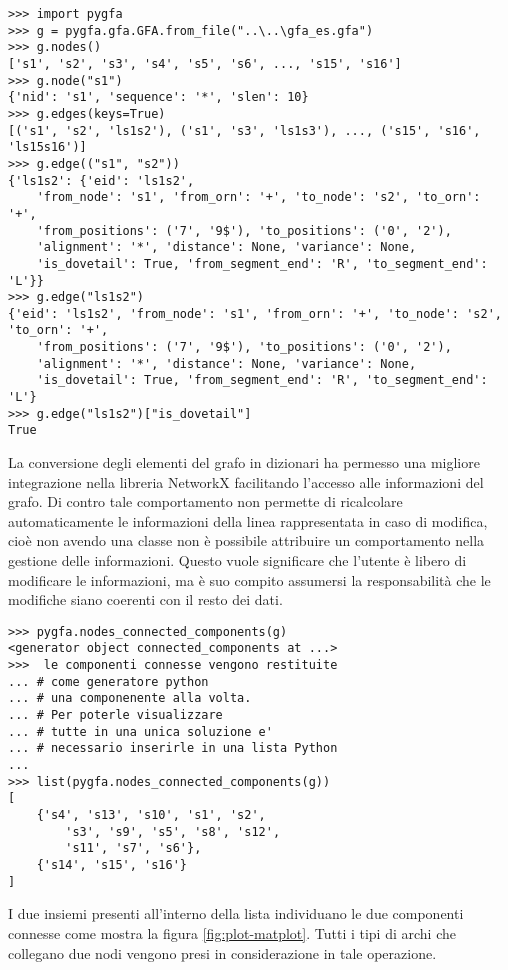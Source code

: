 \captionsetup{justification=centering, singlelinecheck=false}
\begin{minipage}{\linewidth}
\begin{lstlisting}[basicstyle=\ttfamily\scriptsize, frame=topline]
>>> import pygfa
>>> g = pygfa.gfa.GFA.from_file("..\..\gfa_es.gfa")
>>> g.nodes()
['s1', 's2', 's3', 's4', 's5', 's6', ..., 's15', 's16']
>>> g.node("s1")
{'nid': 's1', 'sequence': '*', 'slen': 10}
>>> g.edges(keys=True)
[('s1', 's2', 'ls1s2'), ('s1', 's3', 'ls1s3'), ..., ('s15', 's16', 'ls15s16')]
>>> g.edge(("s1", "s2"))
{'ls1s2': {'eid': 'ls1s2',
	'from_node': 's1', 'from_orn': '+', 'to_node': 's2', 'to_orn': '+',
	'from_positions': ('7', '9$'), 'to_positions': ('0', '2'),
	'alignment': '*', 'distance': None, 'variance': None,
	'is_dovetail': True, 'from_segment_end': 'R', 'to_segment_end': 'L'}}
>>> g.edge("ls1s2")
{'eid': 'ls1s2', 'from_node': 's1', 'from_orn': '+', 'to_node': 's2', 'to_orn': '+',
	'from_positions': ('7', '9$'), 'to_positions': ('0', '2'),
	'alignment': '*', 'distance': None, 'variance': None,
	'is_dovetail': True, 'from_segment_end': 'R', 'to_segment_end': 'L'}
>>> g.edge("ls1s2")["is_dovetail"]
True
\end{lstlisting}
\end{minipage}
\captionsetup{justification=justified, singlelinecheck=false}
La conversione degli elementi del grafo in dizionari ha permesso
una migliore integrazione nella libreria NetworkX facilitando l'accesso
alle informazioni del grafo. Di contro tale comportamento non permette di ricalcolare
automaticamente le informazioni della linea rappresentata in caso di modifica, cioè
non avendo una classe non è possibile attribuire un comportamento nella
gestione delle informazioni. Questo vuole significare che l'utente è libero di modificare
le informazioni, ma è suo compito assumersi la responsabilità che le modifiche
siano coerenti con il resto dei dati.


\captionsetup{justification=centering, singlelinecheck=false}
\begin{minipage}{\linewidth}
\begin{lstlisting}[basicstyle=\ttfamily\scriptsize, frame=topline, breaklines=true]
>>> pygfa.nodes_connected_components(g)
<generator object connected_components at ...>
>>>  le componenti connesse vengono restituite 
... # come generatore python
... # una componenente alla volta.
... # Per poterle visualizzare
... # tutte in una unica soluzione e'
... # necessario inserirle in una lista Python	
...
>>> list(pygfa.nodes_connected_components(g))
[
	{'s4', 's13', 's10', 's1', 's2',
		's3', 's9', 's5', 's8', 's12',
		's11', 's7', 's6'},
	{'s14', 's15', 's16'}
]
\end{lstlisting}
\end{minipage}
\captionsetup{justification=justified, singlelinecheck=false}
I due insiemi presenti all'interno della lista individuano le due componenti
connesse come mostra la figura \ref{fig:plot-matplot}. Tutti i tipi di archi che collegano
due nodi vengono presi in considerazione in tale operazione.


